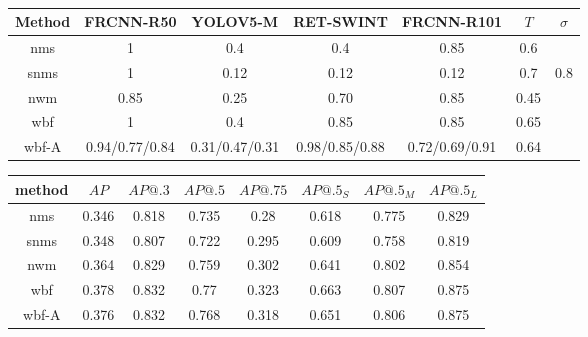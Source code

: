 

\begin{table}
    \begin{tabular}{c||c|c|c|c|c|c}
        Method & FRCNN-R50      & YOLOV5-M       & RET-SWINT      & FRCNN-R101     & $T$  & $\sigma$ \\ \hline
        nms    & 1              & 0.4            & 0.4            & 0.85           & 0.6  &          \\ \hline
        snms   & 1              & 0.12           & 0.12           & 0.12           & 0.7  & 0.8      \\ \hline
        nwm    & 0.85           & 0.25           & 0.70           & 0.85           & 0.45 &          \\ \hline
        wbf    & 1              & 0.4            & 0.85           & 0.85           & 0.65 &          \\ \hline
        wbf-A  & 0.94/0.77/0.84 & 0.31/0.47/0.31 & 0.98/0.85/0.88 & 0.72/0.69/0.91 & 0.64 &          \\ \hline
    \end{tabular}
    \caption{}
\end{table}


\begin{table}
    \centering
    \begin{tabular}{c|c|c|c|c|c|c|c}

        method & $AP$  & $AP@.3$ & $AP@.5$ & $AP@.75$ & $AP@.5_S$ & $AP@.5_M$ & $AP@.5_L$ \\ \hline \hline
        nms    & 0.346 & 0.818   & 0.735   & 0.28     & 0.618     & 0.775     & 0.829     \\ \hline
        snms   & 0.348 & 0.807   & 0.722   & 0.295    & 0.609     & 0.758     & 0.819     \\ \hline
        nwm    & 0.364 & 0.829   & 0.759   & 0.302    & 0.641     & 0.802     & 0.854     \\ \hline
        wbf    & 0.378 & 0.832   & 0.77    & 0.323    & 0.663     & 0.807     & 0.875     \\ \hline
        wbf-A  & 0.376 & 0.832   & 0.768   & 0.318    & 0.651     & 0.806     & 0.875     \\ \hline
    \end{tabular}
\end{table}


